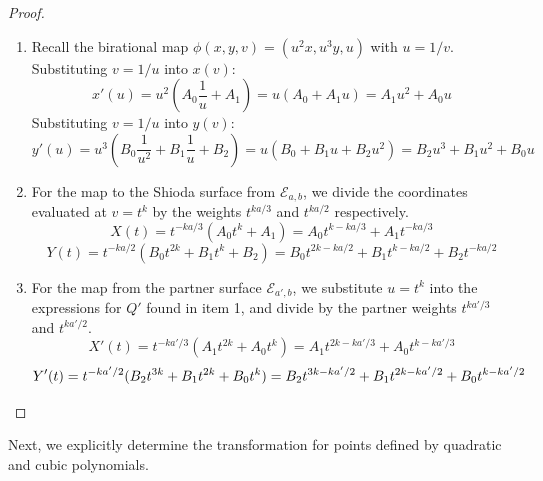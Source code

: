 \documentclass[11pt]{amsart}
\newcommand{\Ee}{{\mathcal E}}
\numberwithin{equation}{section}
\numberwithin{table}{section}
\newcommand\<{\langle}
\begin{document}
 
\begin{proof}
\begin{enumerate}
	\item[(i)] Recall the birational map $\phi(x,y,v) = (u^2 x, u^3 y, u)$ with $u=1/v$. 
	Substituting $v=1/u$ into $x(v)$:
	\[ x'(u) = u^2 \left( A_0 \frac{1}{u} + A_1 \right) = u(A_0 + A_1 u) = A_1 u^2 + A_0 u \]
	Substituting $v=1/u$ into $y(v)$:
	\[ y'(u) = u^3 \left( B_0 \frac{1}{u^2} + B_1 \frac{1}{u} + B_2 \right) = u(B_0 + B_1 u + B_2 u^2) = B_2 u^3 + B_1 u^2 + B_0 u \]
	
	\item[(ii)] For the map to the Shioda surface from $\Ee_{a,b}$, we divide the coordinates evaluated at $v=t^k$ by the weights $t^{ka/3}$ and $t^{ka/2}$ respectively.
	\[ X(t) = t^{-ka/3}(A_0 t^k + A_1) = A_0 t^{k - ka/3} + A_1 t^{-ka/3} \]
	\[ Y(t) = t^{-ka/2}(B_0 t^{2k} + B_1 t^k + B_2) = B_0 t^{2k - ka/2} + B_1 t^{k - ka/2} + B_2 t^{-ka/2} \]
	
	\item[(iii)] For the map from the partner surface $\Ee_{a', b}$, we substitute $u=t^k$ into the expressions for $Q'$ found in item 1, and divide by the partner weights $t^{ka'/3}$ and $t^{ka'/2}$.
	\[ X'(t) = t^{-ka'/3}(A_1 t^{2k} + A_0 t^k) = A_1 t^{2k - ka'/3} + A_0 t^{k - ka'/3} \]
	\[ Y'(t) = t^{-ka'/2}(B_2 t^{3k} + B_1 t^{2k} + B_0 t^k) = B_2 t^{3k - ka'/2} + B_1 t^{2k - ka'/2} + B_0 t^{k - ka'/2} \qedhere \]
		\end{enumerate}
\end{proof}


Next, we explicitly determine the transformation for points defined by quadratic and cubic polynomials.
\end{document}
